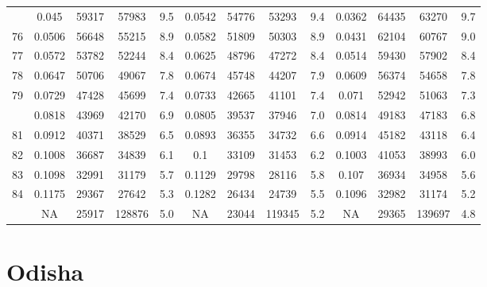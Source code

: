 \documentclass[
  14pt,
]{article}
\begin{document}
\begin{longtable}[t]{lcccccccccccc}
\addlinespace
75 & 0.045 & 59317 & 57983 & 9.5 & 0.0542 & 54776 & 53293 & 9.4 & 0.0362 & 64435 & 63270 & 9.7\\
76 & 0.0506 & 56648 & 55215 & 8.9 & 0.0582 & 51809 & 50303 & 8.9 & 0.0431 & 62104 & 60767 & 9.0\\
77 & 0.0572 & 53782 & 52244 & 8.4 & 0.0625 & 48796 & 47272 & 8.4 & 0.0514 & 59430 & 57902 & 8.4\\
78 & 0.0647 & 50706 & 49067 & 7.8 & 0.0674 & 45748 & 44207 & 7.9 & 0.0609 & 56374 & 54658 & 7.8\\
79 & 0.0729 & 47428 & 45699 & 7.4 & 0.0733 & 42665 & 41101 & 7.4 & 0.071 & 52942 & 51063 & 7.3\\
\addlinespace
80 & 0.0818 & 43969 & 42170 & 6.9 & 0.0805 & 39537 & 37946 & 7.0 & 0.0814 & 49183 & 47183 & 6.8\\
81 & 0.0912 & 40371 & 38529 & 6.5 & 0.0893 & 36355 & 34732 & 6.6 & 0.0914 & 45182 & 43118 & 6.4\\
82 & 0.1008 & 36687 & 34839 & 6.1 & 0.1 & 33109 & 31453 & 6.2 & 0.1003 & 41053 & 38993 & 6.0\\
83 & 0.1098 & 32991 & 31179 & 5.7 & 0.1129 & 29798 & 28116 & 5.8 & 0.107 & 36934 & 34958 & 5.6\\
84 & 0.1175 & 29367 & 27642 & 5.3 & 0.1282 & 26434 & 24739 & 5.5 & 0.1096 & 32982 & 31174 & 5.2\\
\addlinespace
85 & NA & 25917 & 128876 & 5.0 & NA & 23044 & 119345 & 5.2 & NA & 29365 & 139697 & 4.8\\*
\end{longtable}

\pagebreak

\hypertarget{odisha}{%
\section{Odisha}\label{odisha}}
\end{document}
